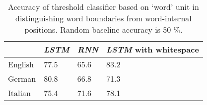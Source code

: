 \begin{table}[t]
	\small
  \begin{center}
    \begin{tabular}{l|l|l||l}
      \multicolumn{1}{c|}{}&\emph{LSTM}&\emph{RNN}&\emph{LSTM} with whitespace\\
      \hline
	    English & 77.5 & 65.6 & 83.2 \\ 
	    German & 80.8 & 66.8  & 71.3  \\ 
	    Italian & 75.4 & 71.6 & 78.1 \\ 
    \end{tabular}
  \end{center}
  \caption{\label{tab:segmentation-unit-results} Accuracy of threshold classifier based on `word' unit in distinguishing word boundaries from word-internal positions. Random baseline accuracy is 50 \%.}
\end{table}









